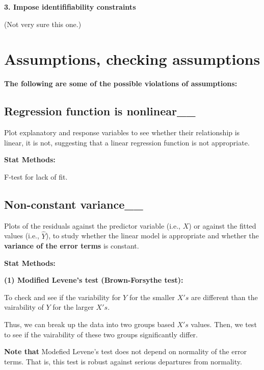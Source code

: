 \documentclass[]{book}
\begin{document}
\textbf{3. Impose identififiability constraints}

(Not very sure this one.)

\hypertarget{assumptions-checking-assumptions}{%
\section{Assumptions, checking assumptions}\label{assumptions-checking-assumptions}}

\textbf{The following are some of the possible violations of assumptions:}

\hypertarget{regression-function-is-nonlinear__}{%
\subsection{Regression function is nonlinear\_\_}\label{regression-function-is-nonlinear__}}

Plot explanatory and response variables to see whether their relationship is linear, it is not, suggesting that a linear regression function is not appropriate.

\textbf{Stat Methods:}

F-test for lack of fit.

\hypertarget{non-constant-variance__}{%
\subsection{Non-constant variance\_\_}\label{non-constant-variance__}}

Plots of the residuals against the predictor variable (i.e., \(X\)) or against the fitted values (i.e., \(\hat{Y}\)), to study whether the linear model is appropriate and whether the \textbf{variance of the error terms} is constant.

\textbf{Stat Methods:}

\textbf{(1) Modified Levene's test (Brown-Forsythe test):}

To check and see if the variability for \(Y\) for the smaller \(X's\) are different than the vairability of \(Y\) for the larger \(X's\).

Thus, we can break up the data into two groups based \(X's\) values. Then, we test to see if the vairability of these two groups significantly differ.

\textbf{Note that} Modefied Levene's test does not depend on normality of the error terms. That is, this test is robust against serious departures from normality.
\end{document}
